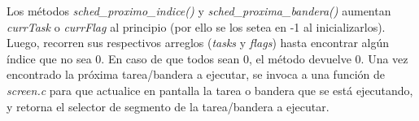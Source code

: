 \documentclass[a4paper]{article}
\begin{document}
Los métodos \textit{sched_proximo_indice()} y \textit{sched_proxima_bandera()} aumentan \textit{currTask} o \textit{currFlag} al principio (por ello se los setea en -1 al inicializarlos). Luego, recorren sus respectivos arreglos (\textit{tasks} y \textit{flags}) hasta encontrar algún índice que no sea 0. En caso de que todos sean 0, el método devuelve 0. Una vez encontrado la próxima tarea/bandera a ejecutar, se invoca a una función de \textit{screen.c} para que actualice en pantalla la tarea o bandera que se está ejecutando, y retorna el selector de segmento de la tarea/bandera a ejecutar.
\end{document}
